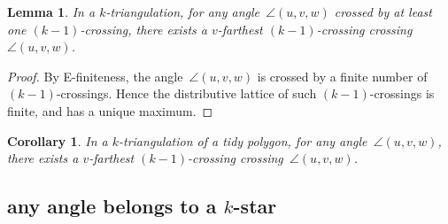 \documentclass{amsart}
\newtheorem{lemma}[theorem]{Lemma}
\newtheorem{corollary}[theorem]{Corollary}
\theoremstyle{remark}
\newcommand*{\ef}[0]{E-finite\xspace}
\newcommand*{\ktg}[0]{$k$-triangulation\xspace}
\begin{document}
\begin{lemma}
In a \ktg, for any angle~$\angle(u,v,w)$ crossed by at least one $(k-1)$-crossing, there exists a $v$-farthest $(k-1)$-crossing crossing~$\angle(u,v,w)$.
\end{lemma}
\begin{proof}
By \ef{}ness, the angle~$\angle(u,v,w)$ is crossed by a finite number of $(k-1)$-crossings. Hence the distributive lattice of such $(k-1)$-crossings is finite, and has a unique maximum.
\end{proof}

\begin{corollary}
In a \ktg of a tidy polygon, for any angle~$\angle(u,v,w)$, there exists a $v$-farthest $(k-1)$-crossing crossing~$\angle(u,v,w)$.
\end{corollary}


\subsection{any angle belongs to a $k$-star}
\end{document}
